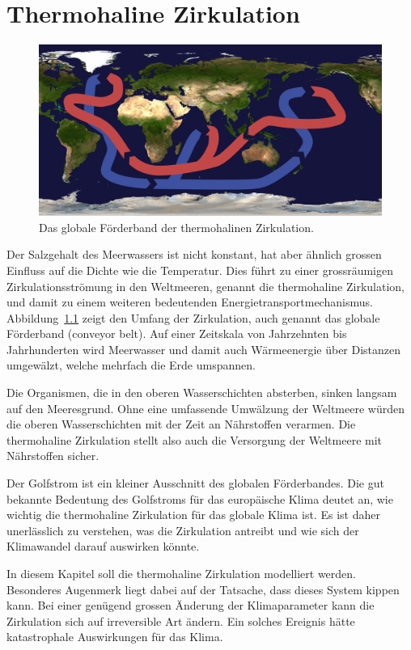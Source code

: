 %
%
%
\chapter{Thermohaline Zirkulation\label{chapter:thc}}
\begin{figure}
\centering
\includegraphics[width=\hsize]{chapters/4/1280px-Thermohaline_circulation.png}
\caption{
Das globale Förderband der thermohalinen Zirkulation.
\label{skript:thc:foerderband}}
\end{figure}%
Der Salzgehalt des Meerwassers ist nicht konstant,
hat aber ähnlich grossen Einfluss auf die Dichte wie die Temperatur.
Dies führt zu einer grossräumigen Zirkulationsströmung in den Weltmeeren,
genannt die thermohaline Zirkulation,
und damit zu einem weiteren bedeutenden Energietransportmechanismus.
Abbildung~\ref{skript:thc:foerderband} zeigt den Umfang der Zirkulation,
auch genannt das globale Förderband (conveyor belt).
Auf einer Zeitskala von Jahrzehnten bis Jahrhunderten wird Meerwasser 
und damit auch Wärmeenergie über Distanzen umgewälzt, welche mehrfach die
Erde umspannen.

Die Organismen, die in den oberen Wasserschichten absterben, sinken langsam
auf den Meeresgrund.
Ohne eine umfassende Umwälzung der Weltmeere würden die oberen Wasserschichten
mit der Zeit an Nährstoffen verarmen.
Die thermohaline Zirkulation stellt also auch die Versorgung der
Weltmeere mit Nährstoffen sicher.

Der Golfstrom ist ein kleiner Ausschnitt des globalen Förderbandes.
Die gut bekannte Bedeutung des Golfstroms für das europäische Klima 
deutet an, wie wichtig die thermohaline Zirkulation für das globale
Klima ist.
Es ist daher unerlässlich zu verstehen, was die Zirkulation antreibt und
wie sich der Klimawandel darauf auswirken könnte.

In diesem Kapitel soll die thermohaline Zirkulation modelliert werden.
Besonderes Augenmerk liegt dabei auf der Tatsache, dass dieses System
kippen kann.
Bei einer genügend grossen Änderung der Klimaparameter kann die Zirkulation
sich auf irreversible Art ändern.
Ein solches Ereignis hätte katastrophale Auswirkungen für das Klima.









